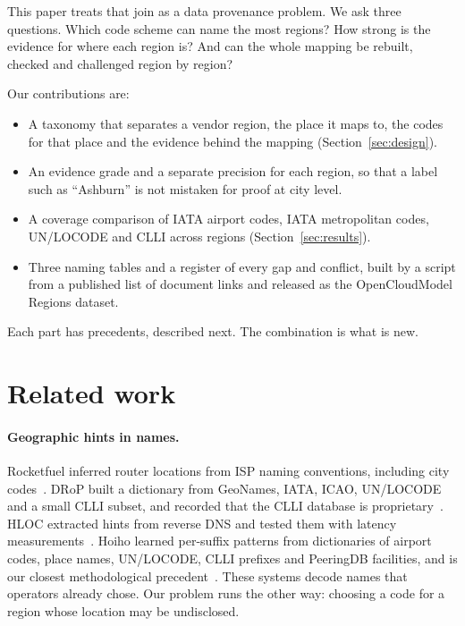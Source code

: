 \documentclass[10pt,twocolumn]{article}
\begin{document}
This paper treats that join as a data provenance problem. We ask three questions. Which code scheme can name the most regions? How strong is the evidence for where each region is? And can the whole mapping be rebuilt, checked and challenged region by region?

Our contributions are:
\begin{itemize}
\item A taxonomy that separates a vendor region, the place it maps to, the codes for that place and the evidence behind the mapping (Section~\ref{sec:design}).
\item An evidence grade and a separate precision for each region, so that a label such as ``Ashburn'' is not mistaken for proof at city level.
\item A coverage comparison of IATA airport codes, IATA metropolitan codes, UN/LOCODE and CLLI across \regionCount{} regions (Section~\ref{sec:results}).
\item Three naming tables and a register of every gap and conflict, built by a script from a published list of document links and released as the OpenCloudModel Regions dataset.
\end{itemize}
Each part has precedents, described next. The combination is what is new.

\section{Related work}
\label{sec:related}

\paragraph{Geographic hints in names.} Rocketfuel inferred router locations from ISP naming conventions, including city codes~\citep{spring2002measuring}. DRoP built a dictionary from GeoNames, IATA, ICAO, UN/LOCODE and a small CLLI subset, and recorded that the CLLI database is proprietary~\citep{huffaker2014drop}. HLOC extracted hints from reverse DNS and tested them with latency measurements~\citep{scheitle2017hloc}. Hoiho learned per-suffix patterns from dictionaries of airport codes, place names, UN/LOCODE, CLLI prefixes and PeeringDB facilities, and is our closest methodological precedent~\citep{luckie2021learning}. These systems decode names that operators already chose. Our problem runs the other way: choosing a code for a region whose location may be undisclosed.
\end{document}
